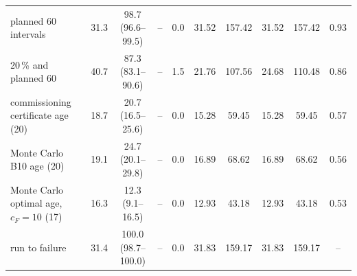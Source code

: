 \begin{table}[htbp]
\begin{tabular*}{\textwidth}{@{\extracolsep{\fill}}lccccccccc@{}}
planned 60 intervals & 31.3 & 98.7 (96.6--99.5) & -- & 0.0 & 31.52 & 157.42 & 31.52 & 157.42 & 0.93 \\
20\,\% and planned 60 & 40.7 & 87.3 (83.1--90.6) & -- & 1.5 & 21.76 & 107.56 & 24.68 & 110.48 & 0.86 \\
commissioning certificate age (20) & 18.7 & 20.7 (16.5--25.6) & -- & 0.0 & 15.28 & 59.45 & 15.28 & 59.45 & 0.57 \\
Monte Carlo B10 age (20) & 19.1 & 24.7 (20.1--29.8) & -- & 0.0 & 16.89 & 68.62 & 16.89 & 68.62 & 0.56 \\
Monte Carlo optimal age, $c_F=10$ (17) & 16.3 & 12.3 (9.1--16.5) & -- & 0.0 & 12.93 & 43.18 & 12.93 & 43.18 & 0.53 \\
run to failure & 31.4 & 100.0 (98.7--100.0) & -- & 0.0 & 31.83 & 159.17 & 31.83 & 159.17 & -- \\
\bottomrule
\end{tabular*}
\end{table}

